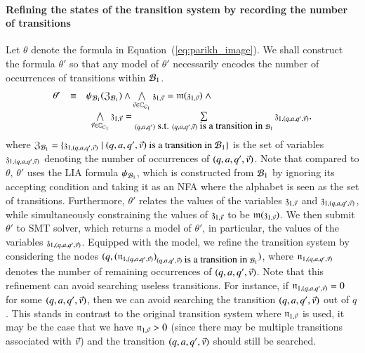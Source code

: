 \paragraph*{Refining the states of the transition system by recording the number of transitions}
Let $\theta$ denote the formula in Equation~(\ref{eq:parikh_image}).
We shall construct the formula $\theta'$ so that any model of $\theta'$ necessarily encodes the number of occurrences of transitions within $\mathcal{B}_1$.
\[
\begin{array}{l c l}
\theta'  & \equiv &  \psi_{\mathcal{B}_1}(\mathfrak{Z}_{\mathcal{B}_1}) \wedge \bigwedge \limits_{\vec{v} \in \mathbb{C}_{\mathcal{C}_1}} \mathfrak{z}_{1, \vec{v}} = \mathfrak{m}(\mathfrak{z}_{1, \vec{v}}) \ \wedge \\
& & \ \ \bigwedge \limits_{\vec{v} \in \mathbb{C}_{\mathcal{C}_1}} \mathfrak{z}_{1, \vec{v}} = \sum \limits_{(q, a, q') \mbox{ s.t. } (q, a, q', \vec{v}) \mbox{ is a transition in } \mathcal{B}_1} \mathfrak{z}_{1, (q, a, q', \vec{v})},
\end{array}
\]
where $\mathfrak{Z}_{\mathcal{B}_1} = \{\mathfrak{z}_{1, (q, a, q', \vec{v})} \mid (q, a, q', \vec{v}) \mbox{ is a transition in } \mathcal{B}_1\}$ is the set of variables $\mathfrak{z}_{1, (q, a, q', \vec{v})}$ denoting the number of occurrences of $(q, a, q', \vec{v})$. 
Note that compared to $\theta$, $\theta'$ uses the LIA formula $\psi_{\mathcal{B}_1}$, which is constructed from $\mathcal{B}_1$ by ignoring its accepting condition and taking it as an NFA where the alphabet is seen as the set of transitions.  Furthermore, $\theta'$ relates the values of the variables $\mathfrak{z}_{1, \vec{v}}$ and $\mathfrak{z}_{1, (q, a, q', \vec{v})}$, while simultaneously constraining the values of $\mathfrak{z}_{1, \vec{v}}$ to be $\mathfrak{m}(\mathfrak{z}_{1, \vec{v}})$. We then submit $\theta'$ to SMT solver, which returns a model of $\theta'$, in particular, the values of the variables $\mathfrak{z}_{1, (q, a, q', \vec{v})}$. Equipped with the model, we refine the transition system by considering the nodes $(q, (\mathfrak{n}_{1, (q, a, q', \vec{v})})_{(q, a, q', \vec{v})\mbox{ is a transition in } \mathcal{B}_1})$, where $\mathfrak{n}_{1, (q, a, q', \vec{v})}$ denotes the number of remaining occurrences of $(q, a, q', \vec{v})$. Note that this refinement can avoid searching useless transitions. For instance, if $\mathfrak{n}_{1, (q, a, q', \vec{v})} = 0$ for some $(q, a, q', \vec{v})$, then we can avoid searching the transition $(q, a, q', \vec{v})$ out of $q$. This stands in contrast to the original transition system where $\mathfrak{n}_{1, \vec{v}}$ is used, it may be the case that we have $\mathfrak{n}_{1, \vec{v}} > 0$ (since there may be multiple transitions associated with $\vec{v}$) and the transition $(q, a, q', \vec{v})$ should still be searched. 


